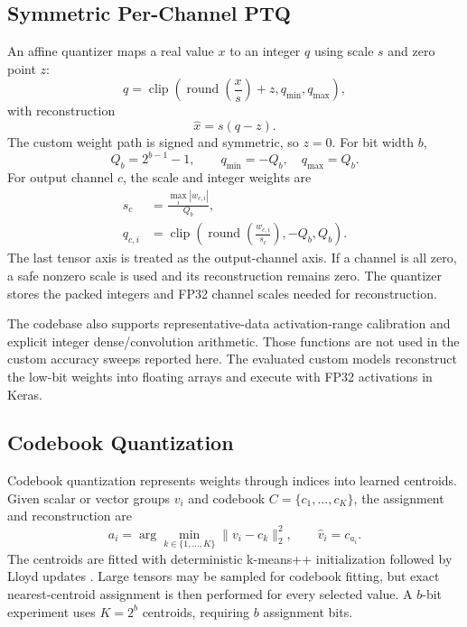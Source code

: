 \documentclass[conference]{IEEEtran}
\begin{document}
\subsection{Symmetric Per-Channel PTQ}

An affine quantizer maps a real value $x$ to an integer $q$ using scale $s$ and zero point $z$:
\begin{equation}
q=\operatorname{clip}\!\left(\operatorname{round}\!\left(\frac{x}{s}\right)+z,q_{\min},q_{\max}\right),
\label{eq:affine-quant}
\end{equation}
with reconstruction
\begin{equation}
\hat{x}=s(q-z).
\label{eq:affine-dequant}
\end{equation}
The custom weight path is signed and symmetric, so $z=0$. For bit width $b$,
\begin{equation}
Q_b=2^{b-1}-1, \qquad q_{\min}=-Q_b, \quad q_{\max}=Q_b.
\end{equation}
For output channel $c$, the scale and integer weights are
\begin{equation}
\begin{aligned}
s_c &= \frac{\max_i |w_{c,i}|}{Q_b}, \\
q_{c,i} &= \operatorname{clip}\!\left(\operatorname{round}\!\left(\frac{w_{c,i}}{s_c}\right),-Q_b,Q_b\right).
\end{aligned}
\label{eq:custom-ptq}
\end{equation}
The last tensor axis is treated as the output-channel axis. If a channel is all zero, a safe nonzero scale is used and its reconstruction remains zero. The quantizer stores the packed integers and FP32 channel scales needed for reconstruction.

The codebase also supports representative-data activation-range calibration and explicit integer dense/convolution arithmetic. Those functions are not used in the custom accuracy sweeps reported here. The evaluated custom models reconstruct the low-bit weights into floating arrays and execute with FP32 activations in Keras.

\subsection{Codebook Quantization}

Codebook quantization represents weights through indices into learned centroids. Given scalar or vector groups $v_i$ and codebook $C=\{c_1,\ldots,c_K\}$, the assignment and reconstruction are
\begin{equation}
a_i=\arg\min_{k\in\{1,\ldots,K\}}\|v_i-c_k\|_2^2,
\qquad \hat{v}_i=c_{a_i}.
\label{eq:codebook}
\end{equation}
The centroids are fitted with deterministic k-means++ initialization \cite{arthur2007} followed by Lloyd updates \cite{lloyd1982}. Large tensors may be sampled for codebook fitting, but exact nearest-centroid assignment is then performed for every selected value. A $b$-bit experiment uses $K=2^b$ centroids, requiring $b$ assignment bits.
\end{document}
